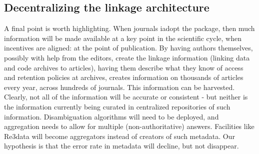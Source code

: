 \subsection{Decentralizing the linkage architecture}
A final point is worth highlighting. When journals iadopt the \metajelo package, then much information will be made available at a key point in the scientific cycle, when incentives are aligned: at the point of publication. By having authors themselves, possibly with help from the editors, create the linkage information (linking data and code archives to articles), having them describe what they know of access and retention policies at archives, creates information on thousands of articles every year, across hundreds of journals. This information can be harvested. Clearly, not all of the information will be accurate or consistent - but neither is the information currently being curated in centralized repositories of such information. Disambiguation algorithms will need to be deployed, and aggregation needs to allow for multiple (non-authoritative) answers. Facilities like Re3data will become aggregators instead of creators of such metadata. Our hypothesis is that the error rate in metadata will decline, but not disappear. 